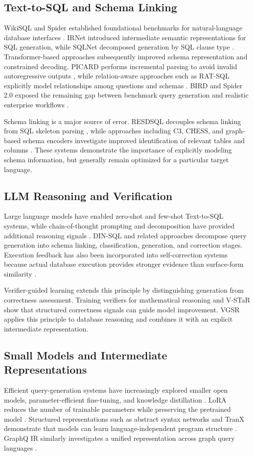 \documentclass[conference]{IEEEtran}
\begin{document}
\subsection{Text-to-SQL and Schema Linking}
WikiSQL and Spider established foundational benchmarks for natural-language database interfaces \cite{b1,b2}. IRNet introduced intermediate semantic representations for SQL generation, while SQLNet decomposed generation by SQL clause type \cite{c1,c2}. Transformer-based approaches subsequently improved schema representation and constrained decoding. PICARD performs incremental parsing to avoid invalid autoregressive outputs \cite{c5}, while relation-aware approaches such as RAT-SQL explicitly model relationships among questions and schemas \cite{c13}. BIRD and Spider 2.0 exposed the remaining gap between benchmark query generation and realistic enterprise workflows \cite{b3,c7}.

Schema linking is a major source of error. RESDSQL decouples schema linking from SQL skeleton parsing \cite{c9}, while approaches including C3, CHESS, and graph-based schema encoders investigate improved identification of relevant tables and columns \cite{c10,c11,c13}. These systems demonstrate the importance of explicitly modeling schema information, but generally remain optimized for a particular target language.

\subsection{LLM Reasoning and Verification}
Large language models have enabled zero-shot and few-shot Text-to-SQL systems, while chain-of-thought prompting and decomposition have provided additional reasoning signals \cite{c16,c19,c20}. DIN-SQL and related approaches decompose query generation into schema linking, classification, generation, and correction stages. Execution feedback has also been incorporated into self-correction systems because actual database execution provides stronger evidence than surface-form similarity \cite{c26,c27,c29}.

Verifier-guided learning extends this principle by distinguishing generation from correctness assessment. Training verifiers for mathematical reasoning \cite{b14,b15} and V-STaR \cite{b16} show that structured correctness signals can guide model improvement. VGSR applies this principle to database reasoning and combines it with an explicit intermediate representation.

\subsection{Small Models and Intermediate Representations}
Efficient query-generation systems have increasingly explored smaller open models, parameter-efficient fine-tuning, and knowledge distillation \cite{c30,c31,c34,c35}. LoRA reduces the number of trainable parameters while preserving the pretrained model \cite{c34}. Structured representations such as abstract syntax networks and TranX demonstrate that models can learn language-independent program structure \cite{b11,c36}. GraphQ IR similarly investigates a unified representation across graph query languages \cite{c37}.
\end{document}
